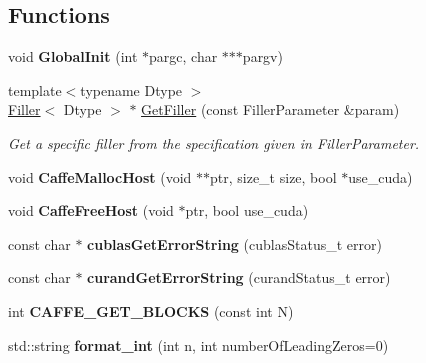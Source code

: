 \subsection*{Functions}
\begin{DoxyCompactItemize}
\item 
void {\bfseries Global\+Init} (int $\ast$pargc, char $\ast$$\ast$$\ast$pargv)\hypertarget{namespacecaffe_aeb24443c97c8ad71325dab3e8b6fe8fa}{}\label{namespacecaffe_aeb24443c97c8ad71325dab3e8b6fe8fa}

\item 
{\footnotesize template$<$typename Dtype $>$ }\\\hyperlink{classcaffe_1_1Filler}{Filler}$<$ Dtype $>$ $\ast$ \hyperlink{namespacecaffe_a819e1b2fe30b54d6df0fd88e646ec126}{Get\+Filler} (const Filler\+Parameter \&param)
\begin{DoxyCompactList}\small\item\em Get a specific filler from the specification given in Filler\+Parameter. \end{DoxyCompactList}\item 
void {\bfseries Caffe\+Malloc\+Host} (void $\ast$$\ast$ptr, size\+\_\+t size, bool $\ast$use\+\_\+cuda)\hypertarget{namespacecaffe_a1d5bca26af8cf109866f31a6a9250673}{}\label{namespacecaffe_a1d5bca26af8cf109866f31a6a9250673}

\item 
void {\bfseries Caffe\+Free\+Host} (void $\ast$ptr, bool use\+\_\+cuda)\hypertarget{namespacecaffe_a7f7cfe1afc7fa32c3f52d12184d8c00d}{}\label{namespacecaffe_a7f7cfe1afc7fa32c3f52d12184d8c00d}

\item 
const char $\ast$ {\bfseries cublas\+Get\+Error\+String} (cublas\+Status\+\_\+t error)\hypertarget{namespacecaffe_ad035f2ba804d9d55dfe0076375a8516c}{}\label{namespacecaffe_ad035f2ba804d9d55dfe0076375a8516c}

\item 
const char $\ast$ {\bfseries curand\+Get\+Error\+String} (curand\+Status\+\_\+t error)\hypertarget{namespacecaffe_a8a736b14d6bccddf4aaf8f6b91db9fc5}{}\label{namespacecaffe_a8a736b14d6bccddf4aaf8f6b91db9fc5}

\item 
int {\bfseries C\+A\+F\+F\+E\+\_\+\+G\+E\+T\+\_\+\+B\+L\+O\+C\+KS} (const int N)\hypertarget{namespacecaffe_a8e21af5757c4326c467f2aafac590350}{}\label{namespacecaffe_a8e21af5757c4326c467f2aafac590350}

\item 
std\+::string {\bfseries format\+\_\+int} (int n, int number\+Of\+Leading\+Zeros=0)\hypertarget{namespacecaffe_a9a6e9df65e5752f2fccc3764efcb310a}{}\label{namespacecaffe_a9a6e9df65e5752f2fccc3764efcb310a}


\end{DoxyCompactItemize}
